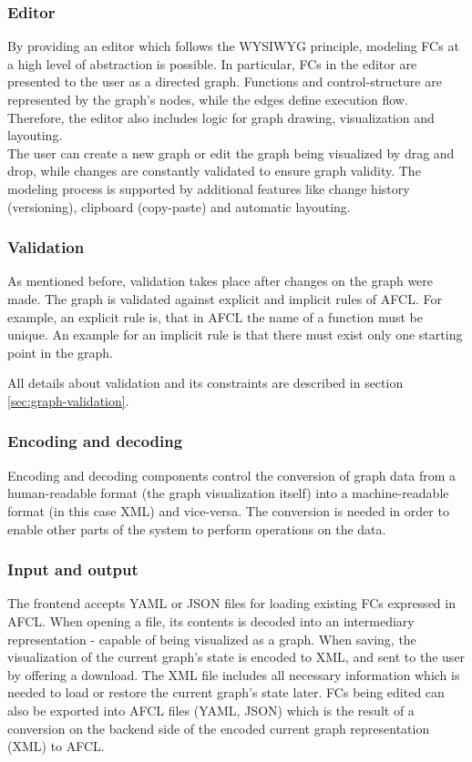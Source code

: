 \documentclass[a4paper,top=25mm,bottom=25mm,12pt,pdftex,halfparskip,twoside,openany,bibtotoc,numbers=noenddot]{scrbook}
\begin{document}
\subsubsection{Editor}

By providing an editor which follows the WYSIWYG principle, modeling FCs at a high level of abstraction is possible.
In particular, FCs in the editor are presented to the user as a directed graph. Functions and control-structure are represented by the graph's nodes, while the edges define execution flow. Therefore, the editor also includes logic for graph drawing, visualization and layouting.\\
The user can create a new graph or edit the graph being visualized by drag and drop, while changes are constantly validated to ensure graph validity.
The modeling process is supported by additional features like change history (versioning), clipboard (copy-paste) and automatic layouting.

\subsubsection{Validation}
As mentioned before, validation takes place after changes on the graph were made. The graph is validated against explicit and implicit rules of AFCL.
For example, an explicit rule is, that in AFCL the name of a function must be unique.
An example for an implicit rule is that there must exist only one starting point in the graph. 

All details about validation and its constraints are described in section \ref{sec:graph-validation}.

\subsubsection{Encoding and decoding}
Encoding and decoding components control the conversion of graph data from a human-readable format (the graph visualization itself) into a machine-readable format (in this case XML) and vice-versa. The conversion is needed in order to enable other parts of the system to perform operations on the data.

\subsubsection{Input and output}

The frontend accepts YAML or JSON files for loading existing FCs expressed in AFCL. When opening a file, its contents is decoded into an intermediary representation - capable of being visualized as a graph. When saving, the visualization of the current graph's state is encoded to XML, and sent to the user by offering a download. The XML file includes all necessary information which is needed to load or restore the current graph's state later. FCs being edited can also be exported into AFCL files (YAML, JSON) which is the result of a conversion on the backend side of the encoded current graph representation (XML) to AFCL.
\end{document}
